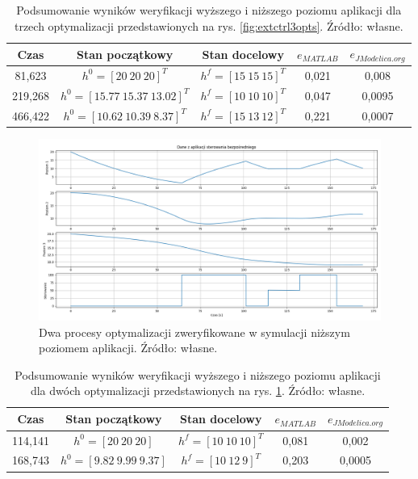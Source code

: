 \begin{table}[htp]
    \centering
    \begin{tabular}{|c|c|c|c|c|}
        \hline 
        \textbf{Czas} & \textbf{Stan początkowy} & \textbf{Stan docelowy} & \textbf{$e_{MATLAB}$} & \textbf{$e_{JModelica.org}$} \\ 
        \hline 
        81,623 & $h^{0} = [20 ~20~ 20]^{T}$ & $h^{f} = [15 ~15~ 15]^{T}$ & 0,021 & 0,008 \\ 
        \hline 
        219,268 & $h^{0} = [15.77~ 15.37~ 13.02]^{T}$ & $h^{f} = [10 ~10~ 10]^{T}$ & 0,047 & 0,0095 \\ 
        \hline 
        466,422 & $h^{0} = [10.62~ 10.39~ 8.37]^{T}$ & $h^{f} = [15 ~13~ 12]^{T}$ & 0,221 & 0,0007 \\ 
        \hline 
    \end{tabular}
\caption{Podsumowanie wyników weryfikacji wyższego i niższego poziomu aplikacji dla trzech optymalizacji przedstawionych na rys. \ref{fig:extctrl3opts}. Źródło: własne.}
\label{tab:extctrl3opts}
\end{table}

\begin{figure}
    \centering
    \includegraphics[scale=0.5,angle=90]{Grafika/ext_ctrl_2_opts}
    \caption{Dwa procesy optymalizacji zweryfikowane w symulacji niższym poziomem aplikacji. Źródło: własne.}
    \label{fig:extctrl2opts}
\end{figure}

\begin{table}[htp]
    \centering
    \begin{tabular}{|c|c|c|c|c|}
        \hline 
        \textbf{Czas} & \textbf{Stan początkowy} & \textbf{Stan docelowy} & \textbf{$e_{MATLAB}$} & \textbf{$e_{JModelica.org}$} \\
        \hline 
        114,141 & $h^{0} = [20~ 20~ 20]$ & $h^{f} = [10 ~10~ 10]^{T}$ & 0,081 & 0,002 \\ 
        \hline 
        168,743 & $h^{0} = [9.82~ 9.99~ 9.37]$ & $h^{f} = [10 ~12~ 9]^{T}$ & 0,203 & 0,0005 \\ 
        \hline 
    \end{tabular}
    \caption{Podsumowanie wyników weryfikacji wyższego i niższego poziomu aplikacji dla dwóch optymalizacji przedstawionych na rys. \ref{fig:extctrl2opts}. Źródło: własne.}
    \label{tab:extctrl2opts}
\end{table}


